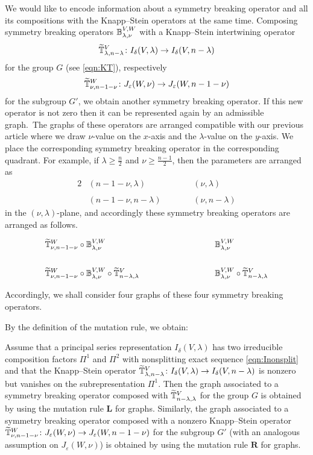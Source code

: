 We would like to encode information about a symmetry breaking operator
 and all its compositions with the Knapp--Stein operators at the same time. 
Composing symmetry breaking operators $\Bbb \lambda \nu {V,W}$
 with a Knapp--Stein intertwining operator 
\[
   \Ttbb \lambda {n-\lambda}V 
   \colon I_\delta(V,\lambda) \rightarrow I_\delta(V,n-\lambda)
\]
 for the group $G$ (see \eqref{eqn:KT}),  respectively 
\[
   \Ttbb \nu {n-1-\nu}W \colon J_\varepsilon(W,\nu) \rightarrow J_\varepsilon(W,n-1-\nu)
\]
 for the subgroup $G'$, 
 we obtain another symmetry breaking operator.  
If this new operator is not zero
 then it can be represented again by an admissible graph.~The graphs of these operators are arranged 
 compatible with our previous article \cite[Figs.~2.1--2.5]{sbon} where we draw $\nu$-value on the $x$-axis
 and the $\lambda$-value on the $y$-axis. 
We place the corresponding symmetry breaking operator in the corresponding quadrant.  
For example,
 if $\lambda \geq \frac{n}{2}$ and $\nu \geq \frac{n-1}{2}$, 
 then the parameters are arranged as 
\begin{alignat*}{2}
& ({n-1-\nu}, \lambda)
\qquad\qquad
&& (\nu,\lambda)
\\
&
&&
\\
& ({n-1-\nu},n-\lambda)
&& (\nu, {n-\lambda})
\end{alignat*}
 in the $(\nu,\lambda)$-plane, 
 and accordingly these symmetry breaking operators
 are arranged as follows.  

\begin{alignat*}{2}
& \Ttbb \nu {n-1-\nu}W \circ \Bbb \lambda \nu  {V,W}
&& \Bbb \lambda \nu {V,W}
\\
&
&&
\\
& \Ttbb \nu {n-1-\nu} W \circ \Bbb \lambda \nu {V,W} 
  \circ \Ttbb {n-\lambda} {\lambda}V
\qquad\qquad\qquad\quad\quad
&& \Bbb \lambda \nu {V,W} \circ \Ttbb {n-\lambda} {\lambda}V
\end{alignat*}


Accordingly,
 we shall consider four graphs
 of these four symmetry breaking operators.  



By the definition of the mutation rule,
 we obtain:
\begin{lemma}
Assume that a principal series representation $I_{\delta}(V,\lambda)$ has 
 two irreducible composition factors $\Pi^1$ and $\Pi^2$
 with nonsplitting exact sequence
 \eqref{eqn:Inonsplit} 
 and that the Knapp--Stein operator
 $\Ttbb \lambda {n-\lambda} V \colon I_{\delta}(V,\lambda) \to 
 I_{\delta}(V,n-\lambda)$ is nonzero 
 but vanishes on the subrepresentation $\Pi^1$.  
Then the graph associated to 
 a symmetry breaking operator composed
 with $\Ttbb {n-\lambda}\lambda V$
 for the group $G$
 is obtained by using the mutation rule ${\mathbf {L}}$ for graphs.  
Similarly,
 the graph associated to a symmetry breaking operator
 composed with a nonzero Knapp--Stein operator
 $\Ttbb \nu{n-1-\nu}W \colon J_{\varepsilon}(W, \nu) 
  \to J_{\varepsilon}(W,n-1-\nu)$
 for the subgroup $G'$
 (with an analogous assumption on $J_{\varepsilon}(W,\nu)$)
 is obtained by using the mutation rule ${\mathbf{R}}$
 for graphs.
\end{lemma}

